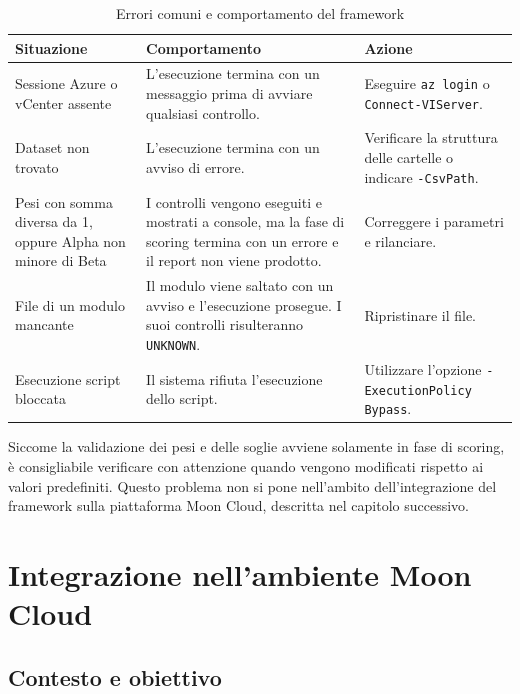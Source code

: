\documentclass[a4paper,11pt]{report}
\begin{document}
\begin{table}[H]
\centering
\small
\renewcommand{\arraystretch}{1.35}
\begin{tabularx}{\textwidth}{
  >{\raggedright\arraybackslash}p{}
  >{\raggedright\arraybackslash}X
  >{\raggedright\arraybackslash}p{}}
\hline
\textbf{Situazione} & \textbf{Comportamento} & \textbf{Azione} \\
\hline
Sessione Azure o vCenter assente & L'esecuzione termina con un messaggio prima di avviare qualsiasi controllo. & Eseguire \texttt{az login} o \texttt{Connect-VIServer}. \\ \hline
Dataset non trovato & L'esecuzione termina con un avviso di errore. & Verificare la struttura delle cartelle o indicare \texttt{-CsvPath}. \\ \hline
Pesi con somma diversa da 1, oppure Alpha non minore di Beta & I controlli vengono eseguiti e mostrati a console, ma la fase di scoring termina con un errore e il report non viene prodotto. & Correggere i parametri e rilanciare. \\ \hline
File di un modulo mancante & Il modulo viene saltato con un avviso e l'esecuzione prosegue. I suoi controlli risulteranno \texttt{UNKNOWN}. & Ripristinare il file. \\ \hline
Esecuzione script bloccata & Il sistema rifiuta l'esecuzione dello script. & Utilizzare l'opzione \texttt{-ExecutionPolicy Bypass}. \\
\hline
\end{tabularx}
\caption{Errori comuni e comportamento del framework}
\label{tab:errori}
\end{table}


Siccome la validazione dei pesi e delle soglie avviene solamente in fase di scoring, è consigliabile verificare con attenzione quando vengono modificati rispetto ai valori predefiniti.
Questo problema non si pone nell'ambito dell'integrazione del framework sulla piattaforma Moon Cloud, descritta nel capitolo successivo.

\chapter{Integrazione nell'ambiente Moon Cloud}


\section{Contesto e obiettivo}
\end{document}
